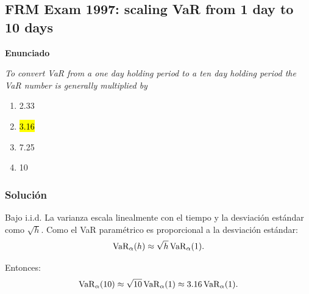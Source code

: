 ﻿\subsection{FRM Exam 1997: scaling VaR from 1 day to 10 days}

\textbf{Enunciado}

\emph{To convert VaR from a one day holding period to a
ten day holding period the VaR number is generally multiplied by}
\begin{enumerate}[label=\alph*.]
\item 2.33
\item \hl{3.16}
\item 7.25
\item 10
\end{enumerate}

\subsubsection*{Solución}

Bajo i.i.d. La varianza escala linealmente con el tiempo y la desviación estándar como \(\sqrt{h}\). Como el VaR paramétrico es proporcional a la desviación estándar:
\[
\mathrm{VaR}_\alpha(h)\approx \sqrt{h}\,\mathrm{VaR}_\alpha(1).
\]

Entonces:
\[
\mathrm{VaR}_\alpha(10)\approx \sqrt{10}\,\mathrm{VaR}_\alpha(1)\approx 3.16\,\mathrm{VaR}_\alpha(1).
\]











